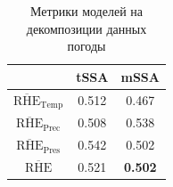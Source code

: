 		\def\arraystretch{1.2}
		\begin{table}[h!]
			\centering
			\caption{Метрики моделей на декомпозиции данных погоды}\label{tab:decomp_weather_results}
			\begin{tabular}{|c|c|c|}
				\hline
				& tSSA  & mSSA           \\ \hline
				$ \overline{\text{RHE}}_{\text{Temp}} $   & 0.512 & 0.467          \\ \hline
				$ \overline{\text{RHE}}_{\text{Prec}} $ & 0.508 & 0.538          \\ \hline
				$ \overline{\text{RHE}}_{\text{Pres}} $   & 0.542 & 0.502          \\ \hline
				$ \overline{\text{RHE}} $         & 0.521 & \textbf{0.502} \\ \hline
			\end{tabular}
		\end{table}
			
		
		\clearpage
		\printbibliography
	
